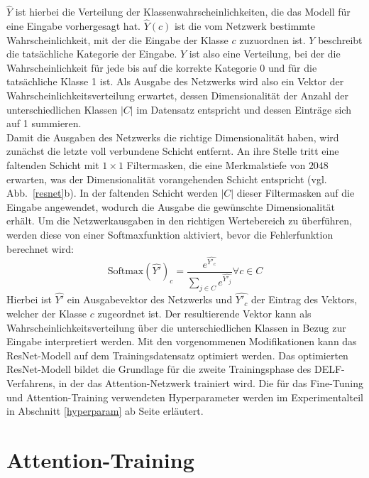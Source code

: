 $\hat{Y}$ ist hierbei die Verteilung der Klassenwahrscheinlichkeiten, die das Modell für eine Eingabe vorhergesagt hat. $\hat{Y}(c)$ ist die vom Netzwerk bestimmte Wahrscheinlichkeit, mit der die Eingabe der Klasse $c$ zuzuordnen ist. $Y$ beschreibt die tatsächliche Kategorie der Eingabe. $Y$ ist also eine Verteilung, bei der die Wahrscheinlichkeit für jede bis auf die korrekte Kategorie 0 und für die tatsächliche Klasse 1 ist. Als Ausgabe des Netzwerks wird also ein Vektor der Wahrscheinlichkeitsverteilung erwartet, dessen Dimensionalität der Anzahl der unterschiedlichen Klassen $|C|$ im Datensatz entspricht und dessen Einträge sich auf 1 summieren. \\
Damit die Ausgaben des Netzwerks die richtige Dimensionalität haben, wird zunächst die letzte voll verbundene Schicht entfernt. An ihre Stelle tritt eine faltenden Schicht mit $1\times1$ Filtermasken, die eine Merkmalstiefe von $2048$ erwarten, was der Dimensionalität vorangehenden Schicht entspricht (vgl. Abb.~\ref{resnet}b). In der faltenden Schicht werden $|C|$ dieser Filtermasken auf die Eingabe angewendet, wodurch die Ausgabe die gewünschte Dimensionalität erhält.
Um die Netzwerkausgaben in den richtigen Wertebereich zu überführen, werden diese von einer Softmaxfunktion aktiviert, bevor die Fehlerfunktion berechnet wird:
\begin{equation}
\text{Softmax}(\hat{Y'})_{c} = \frac{e^{\hat{Y'_c}}}{\sum_{ j \in C}{e^{\hat{Y'_j}}}} \forall c \in C
\end{equation}
Hierbei ist $\hat{Y'}$ ein Ausgabevektor des Netzwerks und $\hat{Y'_c}$ der Eintrag des Vektors, welcher der Klasse $c$ zugeordnet ist. Der resultierende Vektor kann als Wahrscheinlichkeitsverteilung über die unterschiedlichen Klassen in Bezug zur Eingabe interpretiert werden. Mit den vorgenommenen Modifikationen kann das ResNet-Modell auf dem Trainingsdatensatz optimiert werden. Das optimierten ResNet-Modell bildet die Grundlage für die zweite Trainingsphase des DELF-Verfahrens, in der das Attention-Netzwerk trainiert wird. Die für das Fine-Tuning und Attention-Training verwendeten Hyperparameter werden im Experimentalteil in Abschnitt \ref{hyperparam} ab Seite \pageref{hyperparam} erläutert.

\section{Attention-Training}

